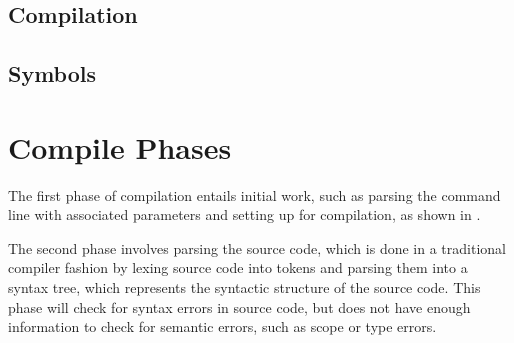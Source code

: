 \subsection{Compilation}
\subsection{Symbols}

	
	

\section{Compile Phases}


The first phase of compilation entails initial work, such as parsing the command line with associated parameters and setting up for compilation, as shown in .

The second phase involves parsing the source code, which is done in a traditional compiler fashion by lexing source code into tokens and parsing them into a syntax tree, which represents the syntactic structure of the source code. This phase will check for syntax errors in source code, but does not have enough information to check for semantic errors, such as scope or type errors.

